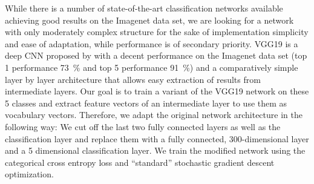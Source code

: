 While there is a number of state-of-the-art classification networks available achieving good results on the Imagenet data set, we are looking for a network with only moderately complex structure for the sake of implementation simplicity and ease of adaptation, while performance is of secondary priority.
VGG19 is a deep \acf{CNN} proposed by \textcite{Simonyan2014} with a decent performance on the Imagenet data set (top 1 performance \SI{73}{\percent} and top 5 performance \SI{91}{\percent}) and a comparatively simple layer by layer architecture that allows easy extraction of results from intermediate layers.
Our goal is to train a variant of the VGG19 network on these \num{5} classes and extract feature vectors of an intermediate layer to use them as vocabulary vectors.
Therefore, we adapt the original network architecture in the following way:
We cut off the last two fully connected layers as well as the classification layer and replace them with a fully connected, \num{300}-dimensional layer and a \num{5} dimensional classification layer. 
We train the modified network using the categorical cross entropy loss and \enquote{standard} stochastic gradient descent optimization.

